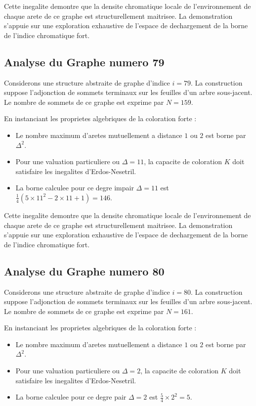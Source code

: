 \documentclass[11pt,a4paper]{article}
\begin{document}
Cette inegalite demontre que la densite chromatique locale de l'environnement de chaque arete de ce graphe est structurellement maitrisee. La demonstration s'appuie sur une exploration exhaustive de l'espace de dechargement de la borne de l'indice chromatique fort.

\subsection{Analyse du Graphe numero 79}
Considerons une structure abstraite de graphe d'indice $i = 79$. La construction suppose l'adjonction de sommets terminaux sur les feuilles d'un arbre sous-jacent. Le nombre de sommets de ce graphe est exprime par $N = 159$.

En instanciant les proprietes algebriques de la coloration forte :
\begin{itemize}
\item Le nombre maximum d'aretes mutuellement a distance $1$ ou $2$ est borne par $\Delta^2$.
\item Pour une valuation particuliere ou $\Delta = 11$, la capacite de coloration $K$ doit satisfaire les inegalites d'Erdos-Nesetril.
\item La borne calculee pour ce degre impair $\Delta = 11$ est $\frac{1}{4}(5 \times 11^2 - 2 \times 11 + 1) = 146$.
\end{itemize}

Cette inegalite demontre que la densite chromatique locale de l'environnement de chaque arete de ce graphe est structurellement maitrisee. La demonstration s'appuie sur une exploration exhaustive de l'espace de dechargement de la borne de l'indice chromatique fort.

\subsection{Analyse du Graphe numero 80}
Considerons une structure abstraite de graphe d'indice $i = 80$. La construction suppose l'adjonction de sommets terminaux sur les feuilles d'un arbre sous-jacent. Le nombre de sommets de ce graphe est exprime par $N = 161$.

En instanciant les proprietes algebriques de la coloration forte :
\begin{itemize}
\item Le nombre maximum d'aretes mutuellement a distance $1$ ou $2$ est borne par $\Delta^2$.
\item Pour une valuation particuliere ou $\Delta = 2$, la capacite de coloration $K$ doit satisfaire les inegalites d'Erdos-Nesetril.
\item La borne calculee pour ce degre pair $\Delta = 2$ est $\frac{5}{4} \times 2^2 = 5$.
\end{itemize}
\end{document}
